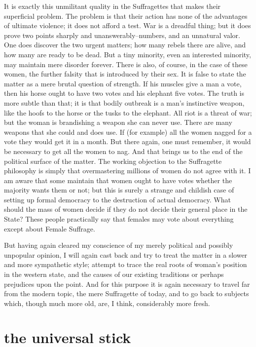 \documentclass[final,10pt,letterpaper,twocolumn,openany]{book}
\begin{document}
It is exactly this unmilitant quality in the Suffragettes that makes their
superficial problem. The problem is that their action has none of the
advantages of ultimate violence; it does not afford a test. War is a dreadful
thing; but it does prove two points sharply and unanswerably--numbers,
and an unnatural valor. One does discover the two urgent matters; how
many rebels there are alive, and how many are ready to be dead. But a tiny
minority, even an interested minority, may maintain mere disorder forever.
There is also, of course, in the case of these women, the further falsity that
is introduced by their sex. It is false to state the matter as a mere brutal
question of strength. If his muscles give a man a vote, then his horse ought
to have two votes and his elephant five votes. The truth is more subtle than
that; it is that bodily outbreak is a man's instinctive weapon, like the hoofs
to the horse or the tusks to the elephant. All riot is a threat of war; but the
woman is brandishing a weapon she can never use. There are many
weapons that she could and does use. If (for example) all the women
nagged for a vote they would get it in a month. But there again, one must
remember, it would be necessary to get all the women to nag. And that
brings us to the end of the political surface of the matter. The working
objection to the Suffragette philosophy is simply that overmastering
millions of women do not agree with it. I am aware that some maintain
that women ought to have votes whether the majority wants them or not;
but this is surely a strange and childish case of setting up formal
democracy to the destruction of actual democracy. What should the mass
of women decide if they do not decide their general place in the State?
These people practically say that females may vote about everything
except about Female Suffrage.

But having again cleared my conscience of my merely political and
possibly unpopular opinion, I will again cast back and try to treat the
matter in a slower and more sympathetic style; attempt to trace the real
roots of woman's position in the western state, and the causes of our
existing traditions or perhaps prejudices upon the point. And for this
purpose it is again necessary to travel far from the modern topic, the mere
Suffragette of today, and to go back to subjects which, though much more
old, are, I think, considerably more fresh.

\section{the universal stick}
\end{document}
